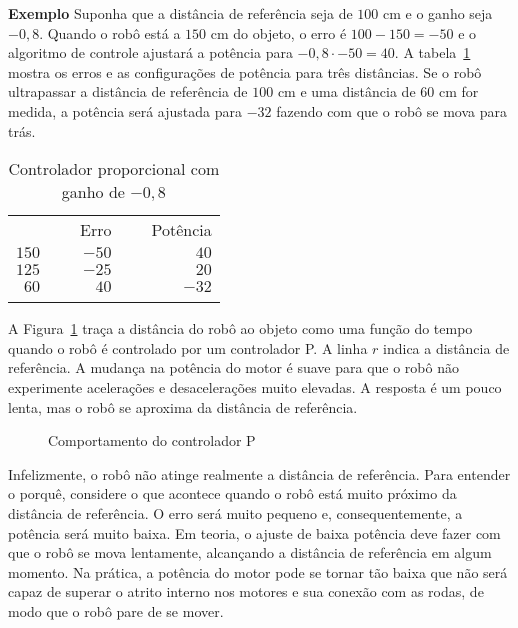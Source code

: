 \smallskip

\noindent\textbf{Exemplo} Suponha que a distância de referência seja de $100$ cm e o ganho seja $-0,8$. Quando o robô está a $150$ cm do objeto, o erro é $100-150=-50$ e o algoritmo de controle ajustará a potência para $-0,8\cdot -50=40$. A tabela~\ref{tab.p-controller} mostra os erros e as configurações de potência para três distâncias. Se o robô ultrapassar a distância de referência de $100$ cm e uma distância de $60$ cm for medida, a potência será ajustada para $-32$ fazendo com que o robô se mova para trás.

\begin{table}
\caption{Controlador proporcional com ganho de $-0,8$}
\label{tab.p-controller}
\begin{tabular}{rrr}
\hline\noalign{\smallskip}
\multicolumn{1}{c}{Distância} & \multicolumn{1}{c}{\ \ \ Erro}& \multicolumn{1}{c}{\ \ \ Potência}\\
\noalign{\smallskip}\hline\noalign{\smallskip}
$150$ & $-50$ & $40$\\
$125$ & $-25$ & $20$\\
$60$ & $40$ & $-32$\\
\noalign{\smallskip}\hline\noalign{\smallskip}
\end{tabular}
\end{table}

A Figura~\ref{fig.p-control} traça a distância do robô ao objeto como uma função do tempo quando o robô é controlado por um controlador P. A linha $r$ indica a distância de referência. A mudança na potência do motor é suave para que o robô não experimente acelerações e desacelerações muito elevadas. A resposta é um pouco lenta, mas o robô se aproxima da distância de referência.

\begin{figure}
\begin{center}
\caption{Comportamento do controlador P}\label{fig.p-control}
\end{center}
\end{figure}

Infelizmente, o robô não atinge realmente a distância de referência. Para entender o porquê, considere o que acontece quando o robô está muito próximo da distância de referência. O erro será muito pequeno e, consequentemente, a potência será muito baixa. Em teoria, o ajuste de baixa potência deve fazer com que o robô se mova lentamente, alcançando a distância de referência em algum momento. Na prática, a potência do motor pode se tornar tão baixa que não será capaz de superar o atrito interno nos motores e sua conexão com as rodas, de modo que o robô pare de se mover.

